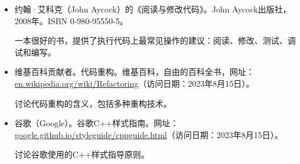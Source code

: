 \begin{itemize}
\hspace*{\fill}

\item
约翰·艾科克（John Aycock）的《阅读与修改代码》。John Aycock出版社，2008年。ISBN 0-980-95550-5。

\hspace*{\fill}

一本很好的书，提供了执行代码上最常见操作的建议：阅读、修改、测试、调试和编写。

\hspace*{\fill}

\item
维基百科贡献者。代码重构。维基百科，自由的百科全书，网址：\url{en.wikipedia.org/wiki/Refactoring}（访问日期：2023年8月15日）。

\hspace*{\fill}

讨论代码重构的含义，包括多种重构技术。

\hspace*{\fill}

\item
谷歌（Google）。谷歌C++样式指南。网址：\url{google.github.io/styleguide/cppguide.html}（访问日期：2023年8月15日）。

\hspace*{\fill}

讨论谷歌使用的C++样式指导原则。
\end{itemize}


